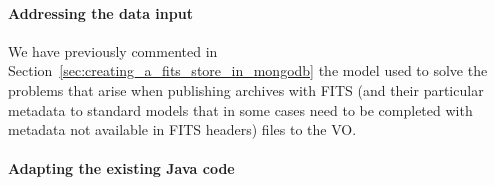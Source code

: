 \paragraph*{Addressing the data input}
\label{sec:data_input}
We have previously commented in Section~\ref{sec:creating_a_fits_store_in_mongodb} the model used to solve the problems that arise when publishing archives with FITS (and their particular metadata to standard models that in some cases need to be completed with metadata not available in FITS headers) files to the VO.

\paragraph*{Adapting the existing Java code}
\label{sec:spring_mongo}